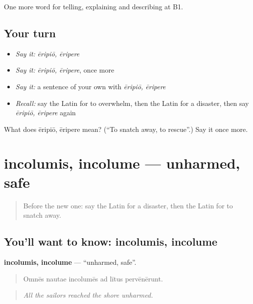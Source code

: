 \begin{grammarlens}[title={What you've built}]
One more word for telling, explaining and describing at B1.
\end{grammarlens}

\subsection*{Your turn}
\begin{itemize}
\raggedright
  \item \emph{Say it:} \emph{ēripiō, ēripere}
  \item \emph{Say it:} \emph{ēripiō, ēripere}, once more
  \item \emph{Say it:} a sentence of your own with \emph{ēripiō, ēripere}
  \item \emph{Recall:} say the Latin for to overwhelm, then the Latin for a disaster, then say \emph{ēripiō, ēripere} again
\end{itemize}

\begin{tcolorbox}[breakable,colback=teal!4,colframe=teal!35!black,title={Before you move on}]
What does ēripiō, ēripere mean? (\textquotedblleft{}To snatch away, to rescue\textquotedblright{}.) Say it once more.
\end{tcolorbox}
\section[incolumis, incolume]{incolumis, incolume — unharmed, safe}

\label{lesson:LA-C316-incolumis}



\begin{quote}
Before the new one: say the Latin for a disaster, then the Latin for to snatch away.
\end{quote}

\subsection*{You'll want to know: incolumis, incolume}
\textbf{incolumis, incolume} — \textquotedblleft{}unharmed, safe\textquotedblright{}.

\begin{quote}
Omnēs nautae incolumēs ad lītus pervēnērunt.
\end{quote}

\begin{quote}
\emph{All the sailors reached the shore unharmed.}
\end{quote}

